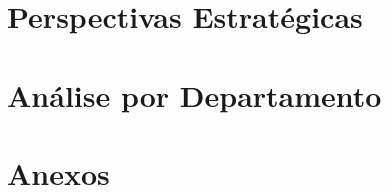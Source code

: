 \documentclass[10pt,a5paper,twoside]{book}
\begin{document}
\part{Perspectivas Estrat\'egicas}




\part{An\'alise por Departamento}



\part{Anexos}





\end{document}
